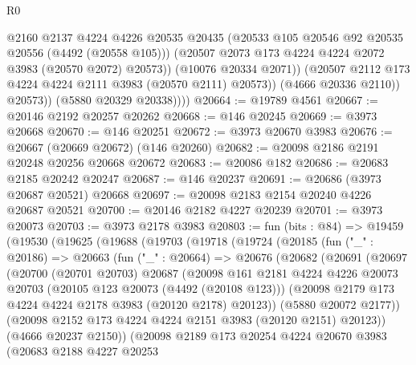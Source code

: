 \begin{lexlean}{R0}
\begin{coremodule}
                      @2160
                      @2137
                      @4224
                      @4226
                      @20535
                      @20435
                      (@20533 @105 @20546 @92 @20535 @20556 (@4492 (@20558 @105)))
                      (@20507 @2073 @173 @4224 @4224 @2072 @3983 (@20570 @2072) @20573))
                    (@10076 @20334 @2071))
                  (@20507 @2112 @173 @4224 @4224 @2111 @3983 (@20570 @2111) @20573))
                (@4666 @20336 @2110))
              @20573))
          (@5880 @20329 @20338))))
@20664 := @19789 @4561
@20667 := @20146 @2192 @20257 @20262
@20668 := @146 @20245
@20669 := @3973 @20668
@20670 := @146 @20251
@20672 := @3973 @20670 @3983
@20676 := @20667 (@20669 @20672) (@146 @20260)
@20682 := @20098 @2186 @2191 @20248 @20256 @20668 @20672
@20683 := @20086 @182
@20686 := @20683 @2185 @20242 @20247
@20687 := @146 @20237
@20691 := @20686 (@3973 @20687 @20521) @20668
@20697 := @20098 @2183 @2154 @20240 @4226 @20687 @20521
@20700 := @20146 @2182 @4227 @20239
@20701 := @3973 @20073
@20703 := @3973 @2178 @3983
@20803 := fun (bits : @84) =>
  @19459
    (@19530
      (@19625
        (@19688
          (@19703
            (@19718
              (@19724
                (@20185
                  (fun ("_" : @20186) =>
                  @20663
                    (fun ("_" : @20664) =>
                    @20676
                      (@20682
                        (@20691
                          (@20697
                            (@20700
                              (@20701 @20703)
                              @20687
                              (@20098
                                @161
                                @2181
                                @4224
                                @4226
                                @20073
                                @20703
                                (@20105 @123 @20073 (@4492 (@20108 @123)))
                                (@20098 @2179 @173 @4224 @4224 @2178 @3983 (@20120 @2178) @20123))
                              (@5880 @20072 @2177))
                            (@20098 @2152 @173 @4224 @4224 @2151 @3983 (@20120 @2151) @20123))
                          (@4666 @20237 @2150))
                        (@20098
                          @2189
                          @173
                          @20254
                          @4224
                          @20670
                          @3983
                          (@20683
                            @2188
                            @4227
                            @20253

\end{coremodule}
\end{lexlean}
